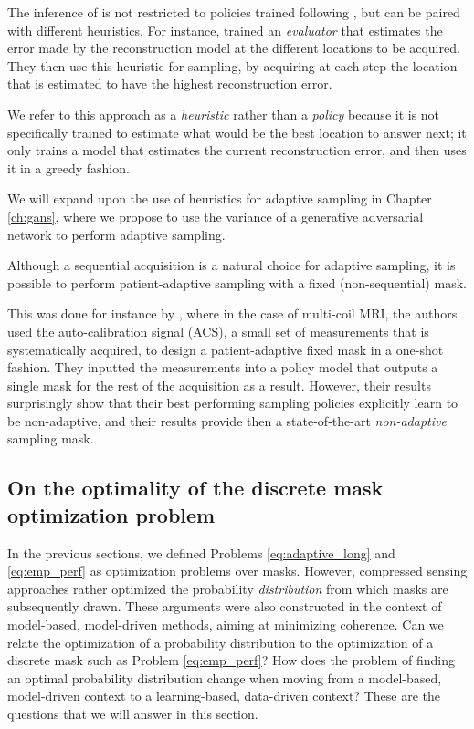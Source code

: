 \begin{remark} The inference of  is not restricted to policies trained following , but can be paired with different heuristics. For instance, \citet{zhang2019reducing} trained an \textit{evaluator} that estimates the error made by the reconstruction model at the different locations to be acquired. They then use this heuristic for sampling, by acquiring at each step the location that is estimated to have the highest reconstruction error. 

We refer to this approach as a \textit{heuristic} rather than a \textit{policy} because it is not specifically trained to estimate what would be the best location to answer next; it only trains a model that estimates the current reconstruction error, and then uses it in a greedy fashion.
    
We will expand upon the use of heuristics for adaptive sampling in Chapter \ref{ch:gans}, where we propose to use the variance of a generative adversarial network \citep{goodfellow2014generative} to perform adaptive sampling.
\end{remark}

\begin{remark} Although a sequential acquisition is a natural choice for adaptive sampling, it is possible to perform patient-adaptive sampling with a fixed (non-sequential) mask. 
    
This was done for instance by \citet{bakker2021learning}, where in the case of multi-coil MRI, the authors used the auto-calibration signal (ACS), a small set of measurements that is systematically acquired, to design a patient-adaptive fixed mask in a one-shot fashion. They inputted the measurements into a policy model that outputs a single mask for the rest of the acquisition as a result. However, their results surprisingly show that their best performing sampling policies explicitly learn to be non-adaptive, and their results provide then a state-of-the-art \textit{non-adaptive} sampling mask.
\end{remark}



\subsection{On the optimality of the discrete mask optimization problem}
In the previous sections, we defined Problems \ref{eq:adaptive_long} and \ref{eq:emp_perf} as optimization problems over masks. However, compressed sensing approaches \citet{puy2011variable, chauffert2013variable} rather optimized the probability \textit{distribution} from which masks are subsequently drawn. These arguments were also constructed in the context of model-based, model-driven methods, aiming at minimizing coherence. Can we relate the optimization of a probability distribution to the optimization of a discrete mask such as Problem \ref{eq:emp_perf}? How does the problem of finding an optimal probability distribution change when moving from a model-based, model-driven context to a learning-based, data-driven context? These are the questions that we will answer in this section.

